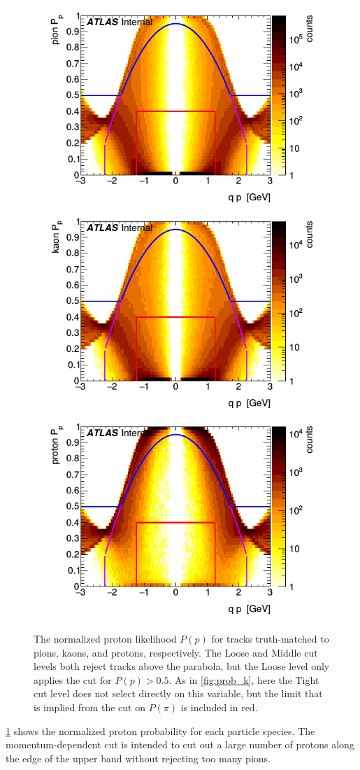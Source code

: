 \begin{figure}[t]
\includegraphics[width=.32\linewidth]{P_pion_p.png}
\includegraphics[width=.32\linewidth]{P_kaon_p.png}
\includegraphics[width=.32\linewidth]{P_proton_p.png}
\caption{The normalized proton likelihood $P(p)$ for tracks truth-matched to pions, kaons, and protons, respectively. The Loose and Middle cut levels both reject tracks above the parabola, but the Loose level only applies the cut for $P(p) > 0.5$. As in \cref{fig:prob_k}, here the Tight cut level does not select directly on this variable, but the limit that is implied from the cut on $P(\pi)$ is included in red.}
\label{fig:prob_p}
\end{figure}

\cref{fig:prob_p} shows the normalized proton probability for each particle species.
The momentum-dependent cut is intended to cut out a large number of protons along the edge of the upper band without rejecting too many pions.

